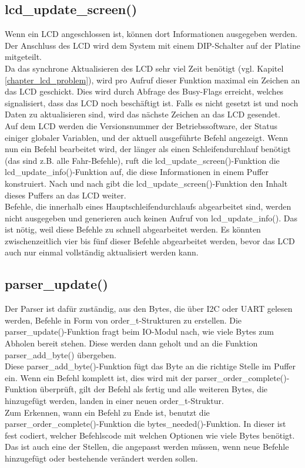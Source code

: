\subsection{lcd\_update\_screen()}
Wenn ein LCD angeschlossen ist, können dort Informationen ausgegeben werden.
Der Anschluss des LCD wird dem System mit einem DIP-Schalter auf der Platine mitgeteilt.\\
Da das synchrone Aktualisieren des LCD sehr viel Zeit benötigt (vgl. Kapitel \ref{chapter_lcd_problem}), wird
pro Aufruf dieser Funktion maximal ein Zeichen an das LCD geschickt.
Dies wird durch Abfrage des Busy-Flags erreicht, welches signalisiert, dass das LCD noch
beschäftigt ist. Falls es nicht gesetzt ist und noch Daten zu aktualisieren sind,
wird das nächste Zeichen an das LCD gesendet.\\
Auf dem LCD werden die Versionsnummer der Betriebssoftware, der Status einiger globaler Variablen, und
der aktuell ausgeführte Befehl angezeigt. Wenn nun ein Befehl bearbeitet wird, der länger als einen
Schleifendurchlauf benötigt (das sind z.B. alle Fahr-Befehle), ruft die lcd\_\-update\_\-screen()-Funktion
die lcd\_\-update\_\-info()-Funktion auf, die diese Informationen in einem Puffer konstruiert. Nach und nach
gibt die lcd\_\-update\_\-screen()-Funktion den Inhalt dieses Puffers an das LCD weiter.\\
Befehle, die innerhalb eines Hauptschleifendurchlaufs abgearbeitet sind, werden nicht ausgegeben und
generieren auch keinen Aufruf von lcd\_\-update\_\-info(). Das ist nötig, weil diese Befehle zu schnell abgearbeitet
werden. Es könnten zwischenzeitlich vier bis fünf dieser Befehle abgearbeitet werden, bevor das LCD auch nur einmal vollständig
aktualisiert werden kann.

\subsection{parser\_update()}
Der Parser ist dafür zuständig, aus den Bytes, die über I2C oder UART gelesen werden, Befehle in Form von
order\_t-Strukturen zu erstellen. Die parser\_\-update()-Funktion fragt beim IO-Modul nach, wie viele Bytes
zum Abholen bereit stehen. Diese werden dann geholt und an die Funktion parser\_\-add\_\-byte() übergeben.\\
Diese parser\_\-add\_\-byte()-Funktion fügt das Byte an die richtige Stelle im Puffer ein. Wenn ein Befehl
komplett ist, dies wird mit der parser\_\-order\_\-complete()-Funktion überprüft, gilt der Befehl als fertig und
alle weiteren Bytes, die hinzugefügt werden, landen in einer neuen order\_t-Struktur.\\
Zum Erkennen, wann ein Befehl zu Ende ist, benutzt die parser\_\-order\_\-complete()-Funktion
die bytes\_\-needed()-Funktion. In dieser ist fest codiert, welcher Befehlscode mit welchen Optionen wie viele
Bytes benötigt. Das ist auch eine der Stellen, die angepasst werden müssen, wenn neue Befehle hinzugefügt
oder bestehende verändert werden sollen.

